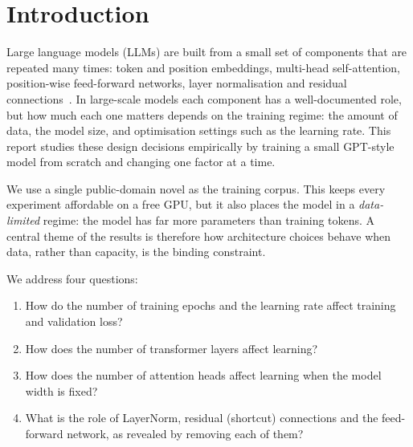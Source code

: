 \documentclass[11pt,a4paper]{article}
\begin{document}
\clearpage
\tableofcontents
\clearpage
{}

\section{Introduction}

Large language models (LLMs) are built from a small set of components that are repeated many times: token and position embeddings, multi-head self-attention, position-wise feed-forward networks, layer normalisation and residual connections~\cite{vaswani2017attention,radford2019gpt2}. In large-scale models each component has a well-documented role, but how much each one matters depends on the training regime: the amount of data, the model size, and optimisation settings such as the learning rate. This report studies these design decisions empirically by training a small GPT-style model from scratch and changing one factor at a time.

We use a single public-domain novel as the training corpus. This keeps every experiment affordable on a free GPU, but it also places the model in a \emph{data-limited} regime: the model has far more parameters than training tokens. A central theme of the results is therefore how architecture choices behave when data, rather than capacity, is the binding constraint.

We address four questions:
\begin{enumerate}[label=\textbf{RQ\arabic*.},leftmargin=*]
  \item How do the number of training epochs and the learning rate affect training and validation loss?
  \item How does the number of transformer layers affect learning?
  \item How does the number of attention heads affect learning when the model width is fixed?
  \item What is the role of LayerNorm, residual (shortcut) connections and the feed-forward network, as revealed by removing each of them?
\end{enumerate}
\end{document}
